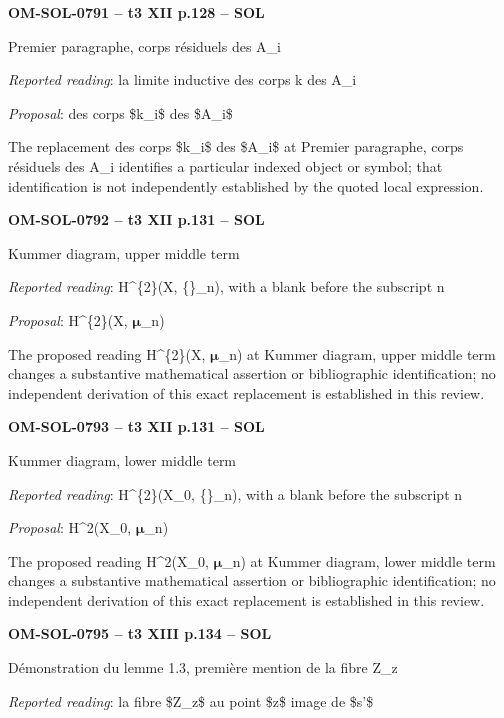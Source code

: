 \par\noindent\textbf{OM-SOL-0791 -- t3 XII p.128 -- SOL}\par
Premier paragraphe, corps résiduels des A\_i\par
\emph{Reported reading}: la limite inductive des corps k des A\_i\par
\emph{Proposal}: des corps \$k\_i\$ des \$A\_i\$\par
The replacement des corps \$k\_i\$ des \$A\_i\$ at Premier paragraphe, corps résiduels des A\_i identifies a particular indexed object or symbol; that identification is not independently established by the quoted local expression.\par
\par\noindent\textbf{OM-SOL-0792 -- t3 XII p.131 -- SOL}\par
Kummer diagram, upper middle term\par
\emph{Reported reading}: H\textasciicircum{}\{2\}(X, \{\}\_n), with a blank before the subscript n\par
\emph{Proposal}: H\textasciicircum{}\{2\}(X, \ensuremath{𝛍}\_n)\par
The proposed reading H\textasciicircum{}\{2\}(X, \ensuremath{𝛍}\_n) at Kummer diagram, upper middle term changes a substantive mathematical assertion or bibliographic identification; no independent derivation of this exact replacement is established in this review.\par
\par\noindent\textbf{OM-SOL-0793 -- t3 XII p.131 -- SOL}\par
Kummer diagram, lower middle term\par
\emph{Reported reading}: H\textasciicircum{}\{2\}(X\_0, \{\}\_n), with a blank before the subscript n\par
\emph{Proposal}: H\textasciicircum{}2(X\_0, \ensuremath{𝛍}\_n)\par
The proposed reading H\textasciicircum{}2(X\_0, \ensuremath{𝛍}\_n) at Kummer diagram, lower middle term changes a substantive mathematical assertion or bibliographic identification; no independent derivation of this exact replacement is established in this review.\par
\par\noindent\textbf{OM-SOL-0795 -- t3 XIII p.134 -- SOL}\par
Démonstration du lemme 1.3, première mention de la fibre Z\_z\par
\emph{Reported reading}: la fibre \$Z\_z\$ au point \$z\$ image de \$s'\$\par
